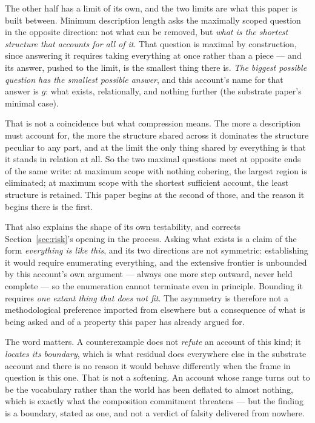 \documentclass[11pt,a4paper]{article}
\theoremstyle{remark}\newtheorem{remark}[definition]{Remark}
\begin{document}
The other half has a limit of its own, and the two limits are what this paper is built between. Minimum
description length asks the maximally scoped question in the opposite direction: not what can be
removed, but \emph{what is the shortest structure that accounts for all of it}. That question is
maximal by construction, since answering it requires taking everything at once rather than a piece ---
and its answer, pushed to the limit, is the smallest thing there is. \emph{The biggest possible question
has the smallest possible answer}, and this account's name for that answer is $g$: what exists,
relationally, and nothing further (the substrate paper's minimal case).

That is not a coincidence but what compression means. The more a description must account for, the more
the structure shared across it dominates the structure peculiar to any part, and at the limit the only
thing shared by everything is that it stands in relation at all. So the two maximal questions meet at
opposite ends of the same write: at maximum scope with nothing cohering, the largest region is
eliminated; at maximum scope with the shortest sufficient account, the least structure is retained.
This paper begins at the second of those, and the reason it begins there is the first.

That also explains the shape of its own testability, and corrects Section~\ref{sec:risk}'s opening in the
process. Asking what exists is a claim of the form \emph{everything is like this}, and its two
directions are not symmetric: establishing it would require enumerating everything, and the extensive
frontier is unbounded by this account's own argument --- always one more step outward, never held
complete --- so the enumeration cannot terminate even in principle. Bounding it requires \emph{one extant thing that does not fit}. The
asymmetry is therefore not a methodological preference imported from elsewhere but a consequence of
what is being asked and of a property this paper has already argued for.

The word matters. A counterexample does not
\emph{refute} an account of this kind; it \emph{locates its boundary}, which is what residual does
everywhere else in the substrate account and there is no reason it would behave differently when the frame in
question is this one. That is not a softening. An account whose range turns out to be the vocabulary
rather than the world has been deflated to almost nothing, which is exactly what the composition
commitment threatens --- but the finding is a boundary, stated as one, and not a verdict of falsity
delivered from nowhere.
\end{document}
